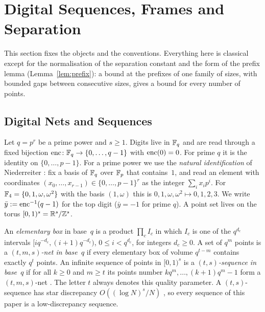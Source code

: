 %
\section{Digital Sequences, Frames and Separation}\label{sec:prelim}
This section fixes the objects and the conventions. Everything here is classical except for the normalisation of the separation constant and the form of the prefix lemma (Lemma~\ref{lem:prefix}): a bound at the prefixes of one family of sizes, with bounded gaps between consecutive sizes, gives a bound for every number of points.

\subsection{Digital Nets and Sequences}
Let $q=p^r$ be a prime power and $s\ge1$. Digits live in $\mathbb{F}_q$ and are read through a fixed bijection $\operatorname{enc}\colon\mathbb{F}_q\to\{0,\dots,q-1\}$ with $\operatorname{enc}(0)=0$. For prime $q$ it is the identity on $\{0,\dots,p-1\}$. For a prime power we use the \emph{natural identification} of Niederreiter \cite{Nie92}: fix a basis of $\mathbb{F}_q$ over $\mathbb{F}_p$ that contains~$1$, and read an element with coordinates $(x_0,\dots,x_{r-1})\in\{0,\dots,p-1\}^r$ as the integer $\sum_ix_ip^i$. For $\mathbb{F}_4=\{0,1,\omega,\omega^2\}$ with the basis $(1,\omega)$ this is $0,1,\omega,\omega^2\mapsto0,1,2,3$. We write $\bar y:=\operatorname{enc}^{-1}(q-1)$ for the top digit ($\bar y=-1$ for prime $q$). A point set lives on the torus $[0,1)^s=\mathbb{R}^s/\mathbb{Z}^s$.

An \emph{elementary box} in base~$q$ is a product $\prod_cI_c$ in which $I_c$ is one of the $q^{d_c}$ intervals $[iq^{-d_c},(i+1)q^{-d_c})$, $0\le i<q^{d_c}$, for integers $d_c\ge0$. A set of $q^m$ points is a \emph{$(t,m,s)$-net in base~$q$} if every elementary box of volume $q^{t-m}$ contains exactly $q^t$ points. An infinite sequence of points in $[0,1)^s$ is a \emph{$(t,s)$-sequence in base~$q$} if for all $k\ge0$ and $m\ge t$ its points number $kq^m,\dots,(k+1)q^m-1$ form a $(t,m,s)$-net \cite{Nie87,Nie92,DP10}. The letter $t$ always denotes this quality parameter. A $(t,s)$-sequence has star discrepancy $O((\log N)^s/N)$ \cite{Nie92}, so every sequence of this paper is a low-discrepancy sequence.

